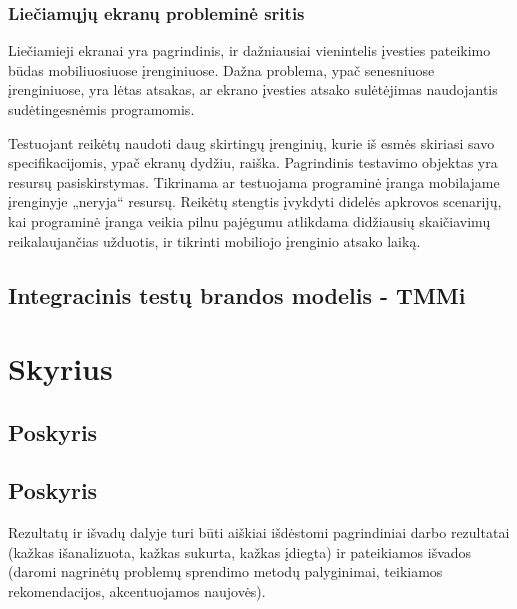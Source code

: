 \documentclass{VUMIFPSkursinis}
\begin{document}
\subsubsection{Liečiamųjų ekranų probleminė sritis}
Liečiamieji ekranai yra pagrindinis, ir dažniausiai vienintelis įvesties pateikimo būdas mobiliuosiuose įrenginiuose. Dažna problema, ypač senesniuose įrenginiuose, yra lėtas atsakas, ar ekrano įvesties atsako sulėtėjimas naudojantis sudėtingesnėmis programomis.

Testuojant reikėtų naudoti daug skirtingų įrenginių, kurie iš esmės skiriasi savo specifikacijomis, ypač ekranų dydžiu, raiška. Pagrindinis testavimo objektas yra resursų pasiskirstymas. Tikrinama ar testuojama programinė įranga mobilajame įrenginyje „neryja“ resursų. Reikėtų stengtis įvykdyti didelės apkrovos scenarijų, kai programinė įranga veikia pilnu pajėgumu atlikdama didžiausių skaičiavimų reikalaujančias užduotis, ir tikrinti mobiliojo įrenginio atsako laiką.

\subsection{Integracinis testų brandos modelis - TMMi}


\section{Skyrius}
\subsection{Poskyris}
\subsection{Poskyris}

Rezultatų ir išvadų dalyje turi būti aiškiai išdėstomi pagrindiniai darbo
rezultatai (kažkas išanalizuota, kažkas sukurta, kažkas įdiegta) ir pateikiamos
išvados (daromi nagrinėtų problemų sprendimo metodų palyginimai, teikiamos
rekomendacijos, akcentuojamos naujovės).

\printbibliography[heading=bibintoc]  %
\end{document}
